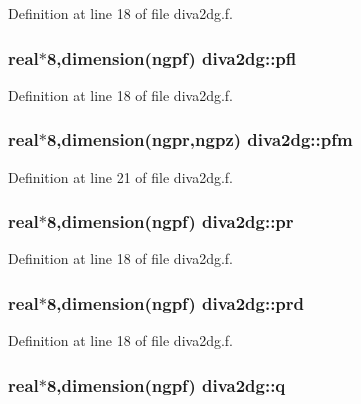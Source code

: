 Definition at line 18 of file diva2dg.f.\hypertarget{namespacediva2dg_321f730bc6ba784a50be03bfc676e6b8}{
\subsubsection[pfl]{\setlength{\rightskip}{0pt plus 5cm}real$\ast$8,dimension(ngpf) {\bf diva2dg::pfl}}}
\label{namespacediva2dg_321f730bc6ba784a50be03bfc676e6b8}




Definition at line 18 of file diva2dg.f.\hypertarget{namespacediva2dg_ac412e391d7bc3f388a20118b792a62d}{
\subsubsection[pfm]{\setlength{\rightskip}{0pt plus 5cm}real$\ast$8,dimension(ngpr,ngpz) {\bf diva2dg::pfm}}}
\label{namespacediva2dg_ac412e391d7bc3f388a20118b792a62d}




Definition at line 21 of file diva2dg.f.\hypertarget{namespacediva2dg_0fddfb0fc5baf44d76608830e93f933c}{
\subsubsection[pr]{\setlength{\rightskip}{0pt plus 5cm}real$\ast$8,dimension(ngpf) {\bf diva2dg::pr}}}
\label{namespacediva2dg_0fddfb0fc5baf44d76608830e93f933c}




Definition at line 18 of file diva2dg.f.\hypertarget{namespacediva2dg_28afc7cdeb0d17dfc2f755ee01aa119f}{
\subsubsection[prd]{\setlength{\rightskip}{0pt plus 5cm}real$\ast$8,dimension(ngpf) {\bf diva2dg::prd}}}
\label{namespacediva2dg_28afc7cdeb0d17dfc2f755ee01aa119f}




Definition at line 18 of file diva2dg.f.\hypertarget{namespacediva2dg_c30c06cc584a484217b2e77ea4afefb0}{
\subsubsection[q]{\setlength{\rightskip}{0pt plus 5cm}real$\ast$8,dimension(ngpf) {\bf diva2dg::q}}}
\label{namespacediva2dg_c30c06cc584a484217b2e77ea4afefb0}




